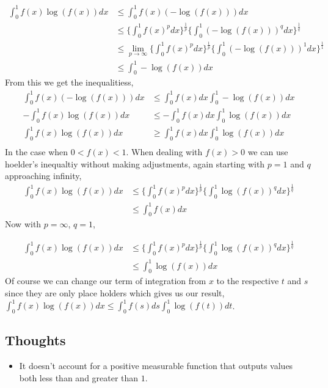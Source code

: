 \documentclass[12pt]{article}
\begin{document}
\begin{align*}
  \int_{0}^{1}f(x)\log(f(x))dx &\leq \int_{0}^{1}f(x)(-\log(f(x)))dx\\
  &\leq \Big\{ \int_{0}^{1}f(x)^{p}dx \Big \}^{\frac{1}{p}} \Big \{  \int_{0}^{1}(-\log(f(x)))^{q}dx \Big \}^{\frac{1}{q}}\\
  &\leq \lim_{p\to\infty}\Big\{ \int_{0}^{1}f(x)^{p}dx \Big \}^{\frac{1}{p}} \Big \{  \int_{0}^{1}(-\log(f(x)))^{1}dx \Big \}^{\frac{1}{1}}\\
  &\leq \int_{0}^{1}-\log(f(x))dx
\end{align*}
From this we get the inequalitiess,
\begin{align*}
  \int_{0}^{1}f(x)(-\log(f(x)))dx &\leq \int_{0}^{1}f(x)dx\int_{0}^{1}-\log(f(x))dx\\
  -\int_{0}^{1}f(x)\log(f(x))dx &\leq -\int_{0}^{1}f(x)dx\int_{0}^{1}\log(f(x))dx\\
  \int_{0}^{1}f(x)\log(f(x))dx &\geq \int_{0}^{1}f(x)dx\int_{0}^{1}\log(f(x))dx\\
\end{align*}
In the case when $0<f(x)<1$. When dealing with $f(x) > 0$ we can use hoelder's inequaltiy 
without making adjustments, again starting with $p = 1$ and $q$
approaching infinity,
\begin{align*}
  \int_{0}^{1}f(x)\log(f(x))dx &\leq \Big\{ \int_{0}^{1}f(x)^{p}dx \Big \}^{\frac{1}{p}} \Big \{  \int_{0}^{1}\log(f(x))^{q}dx \Big \}^{\frac{1}{q}}\\
  &\leq \int_{0}^{1}f(x)dx
\end{align*}
Now with $p = \infty$, $q = 1$,

\begin{align*}
  \int_{0}^{1}f(x)\log(f(x))dx &\leq \Big\{ \int_{0}^{1}f(x)^{p}dx \Big \}^{\frac{1}{p}} \Big \{  \int_{0}^{1}\log(f(x))^{q}dx \Big \}^{\frac{1}{q}}\\
  &\leq \int_{0}^{1}\log(f(x))dx
\end{align*}
Of course we can change our term of integration from $x$ to the
respective $t$ and $s$ since they are only place holders which gives
us our result, $ \int_{0}^{1}f(x)\log(f(x))dx \leq \int_{0}^{1}f(s)ds \int_{0}^{1}\log(f(t))dt$.

\subsection*{Thoughts}
\begin{itemize}
\item It doesn't account for a positive measurable function that
  outputs values both less than and greater than $1$.
\end{itemize}
\end{document}
